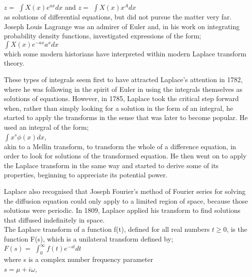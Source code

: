 \documentclass[12pt]{article}
\begin{document}
{$z =$ \(\int X(x) e^{ax} dx\)		and		$z =$ \(\int X(x)x^A dx\)\\

as solutions of differential equations, but did not pursue the matter very far. Joseph Louis Lagrange was an admirer of Euler and, in his work on integrating probability density functions, investigated expressions of the form;\\

\(\int X(x) e^{-ax} a^x dx\)\\

which some modern historians have interpreted within modern Laplace transform theory.

These types of integrals seem first to have attracted Laplace's attention in 1782, where he was following in the spirit of Euler in using the integrals themselves as solutions of equations. However, in 1785, Laplace took the critical step forward when, rather than simply looking for a solution in the form of an integral, he started to apply the transforms in the sense that was later to become popular. He used an integral of the form;\\

\(\int x^s \phi (x) dx\),\\

akin to a Mellin transform, to transform the whole of a difference equation, in order to look for solutions of the transformed equation. He then went on to apply the Laplace transform in the same way and started to derive some of its properties, beginning to appreciate its potential power.

Laplace also recognised that Joseph Fourier's method of Fourier series for solving the diffusion equation could only apply to a limited region of space, because those solutions were periodic. In 1809, Laplace applied his transform to find solutions that diffused indefinitely in space.\\

The Laplace transform of a function f(t), defined for all real numbers $t \geq 0$, is the function F(s), which is a unilateral transform defined by;\\

$F(s) =$ \(\int_{0}^{\infty} f(t)e^{-st}dt\)\\

where s is a complex number frequency parameter\\

$s = \mu + i\omega$,\\

}
\end{document}

